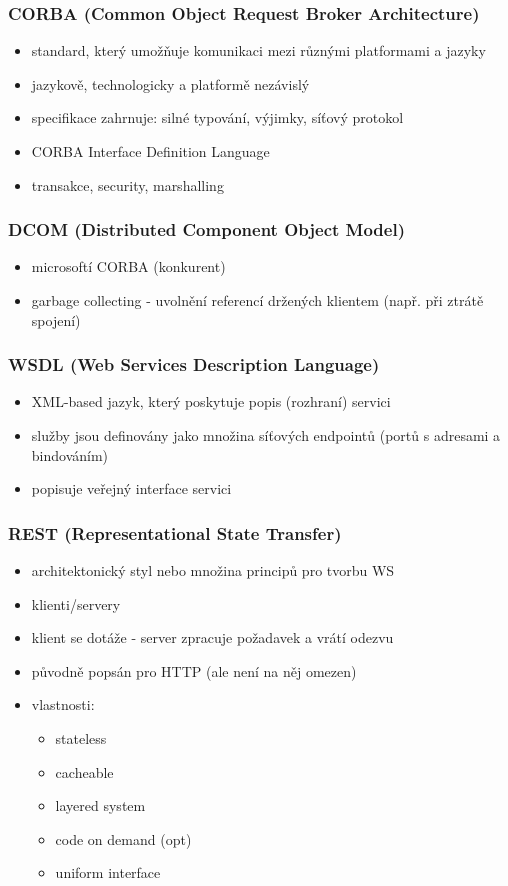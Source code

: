 \subsubsection*{CORBA (Common Object Request Broker Architecture)}
\begin{itemize}[itemsep=0px]
\item standard, který umožňuje komunikaci mezi různými platformami a jazyky
\item jazykově, technologicky a platformě nezávislý
\item specifikace zahrnuje: silné typování, výjimky, síťový protokol
\item CORBA Interface Definition Language
\item transakce, security, marshalling
\end{itemize}
\subsubsection*{DCOM (Distributed Component Object Model)}
\begin{itemize}[itemsep=0px]
\item microsoftí CORBA (konkurent)
\item garbage collecting - uvolnění referencí držených klientem (např. při ztrátě spojení)
\end{itemize}
\subsubsection*{WSDL (Web Services Description Language)}
\begin{itemize}[itemsep=0px]
\item XML-based jazyk, který poskytuje popis (rozhraní) servici
\item služby jsou definovány jako množina síťových endpointů (portů s adresami a
bindováním)
\item popisuje veřejný interface servici
\end{itemize}
\subsubsection*{REST (Representational State Transfer)}
\begin{itemize}[itemsep=0px]
\item architektonický styl nebo množina principů pro tvorbu WS
\item klienti/servery
\item klient se dotáže - server zpracuje požadavek a vrátí odezvu
\item původně popsán pro HTTP (ale není na něj omezen)
\item vlastnosti:
\begin{itemize}[itemsep=0px]
\item stateless
\item cacheable
\item layered system
\item code on demand (opt)
\item uniform interface
\end{itemize}
\end{itemize}
